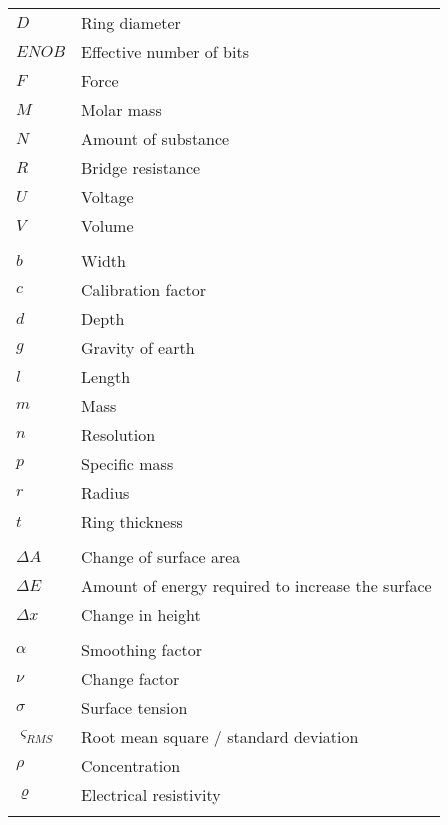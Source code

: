 %
\begin{longtable}[l]{@{}ll@{}}
	\( D \) & Ring diameter\\
	\( ENOB \) & Effective number of bits\\
	\( F \) & Force\\
	\( M \) & Molar mass\\
	\( N \) & Amount of substance\\
	\( R \) & Bridge resistance\\
	\( U \) & Voltage\\
	\( V \) & Volume\\
	\\
	\( b \) & Width\\
	\( c \) & Calibration factor\\
	\( d \) & Depth\\
	\( g \) & Gravity of earth\\
	\( l \) & Length\\
	\( m \) & Mass\\
	\( n \) & Resolution\\
	\( p \) & Specific mass\\
	\( r \) & Radius\\
	\( t \) & Ring thickness\\
	\\
	\( \Delta A \) & Change of surface area\\
	\( \Delta E \) & Amount of energy required to increase the surface\\
	\( \Delta x \) & Change in height\\
	\\
	\( \alpha \) & Smoothing factor\\
	\( \nu \) & Change factor\\
	\( \sigma \) & Surface tension\\
	\( \varsigma_{RMS} \) & Root mean square / standard deviation\\
	\( \rho \) & Concentration\\
	\( \varrho \) & Electrical resistivity\\
	\label{tab:glossar}
\end{longtable}
